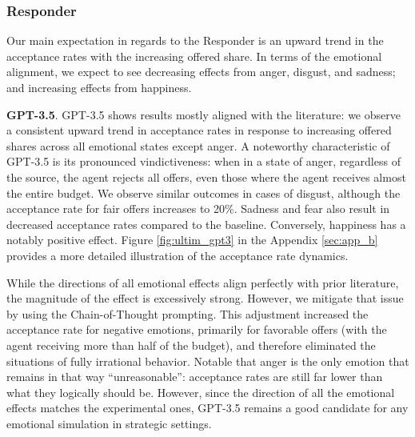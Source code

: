 \documentclass{article}
\begin{document}
\subsubsection{Responder}
Our main expectation in regards to the Responder is an upward trend in the acceptance rates with the increasing offered share. In terms of the emotional alignment, we expect to see decreasing effects from anger, disgust, and sadness; and increasing effects from happiness. 

\textbf{GPT-3.5}. GPT-3.5 shows results mostly aligned with the literature: we observe a consistent upward trend in acceptance rates in response to increasing offered shares across all emotional states except anger. A noteworthy characteristic of GPT-3.5 is its pronounced vindictiveness: when in a state of anger, regardless of the source, the agent rejects all offers, even those where the agent receives almost the entire budget. We observe similar outcomes in cases of disgust, although the acceptance rate for fair offers increases to 20\%. Sadness and fear also result in decreased acceptance rates compared to the baseline. Conversely, happiness has a notably positive effect. Figure \ref{fig:ultim_gpt3} in the Appendix \ref{sec:app_b} provides a more detailed illustration of the acceptance rate dynamics.

While the directions of all emotional effects align perfectly with prior literature, the magnitude of the effect is excessively strong. However, we mitigate that issue by using the Chain-of-Thought prompting. This adjustment increased the acceptance rate for negative emotions, primarily for favorable offers (with the agent receiving more than half of the budget), and therefore eliminated the situations of fully irrational behavior. Notable that anger is the only emotion that remains in that way ``unreasonable'': acceptance rates are still far lower than what they logically should be. However, since the direction of all the emotional effects matches the experimental ones, GPT-3.5 remains a good candidate for any emotional simulation in strategic settings. 
\end{document}
